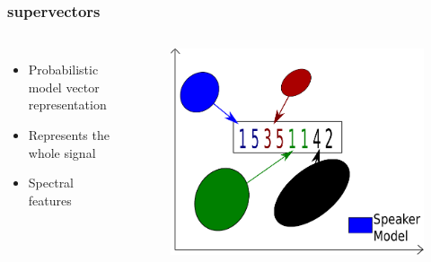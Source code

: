 \documentclass[11pt,english]{beamer}
\begin{document}
\begin{frame}
 \frametitle{supervectors}
  \begin{columns}
    \begin{itemize}
    \item Probabilistic model vector representation
    \item Represents the whole signal
    \item Spectral features
    \end{itemize}
    \begin{figure}
        \centering
       \includegraphics[scale = 0.5]{supervectors.pdf}
      \end{figure}
  \end{columns}
\end{frame}
\end{document}
